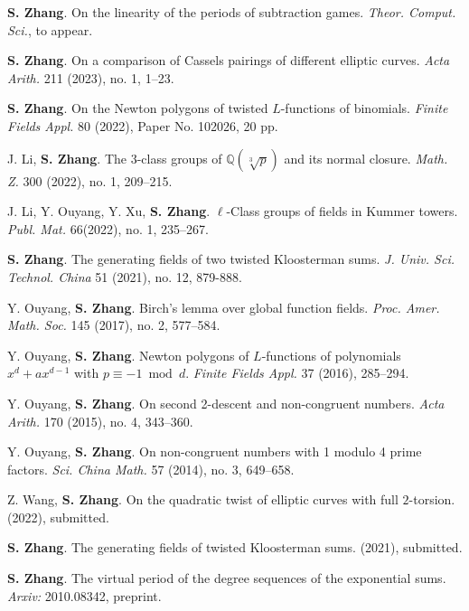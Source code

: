 \documentclass[11pt]{article}
\begin{document}
\newpage
{}
\begin{cvlist}
	\item \textbf{S. Zhang}.
	On the linearity of the periods of subtraction games.
	{\em Theor. Comput. Sci.}, to appear.
	
	\item \textbf{S. Zhang}.
	On a comparison of Cassels pairings of different elliptic curves.
	{\em Acta Arith.} 211 (2023), no. 1, 1--23.
	
	\item \textbf{S. Zhang}.
	On the Newton polygons of twisted $L$-functions of binomials.
	{\em Finite Fields Appl.} 80 (2022), Paper No. 102026, 20 pp.

	\item J. Li, \textbf{S. Zhang}.
	The $3$-class groups of $\mathbb{Q}(\sqrt[3]{p})$ and its normal closure.
	{\em Math. Z.} 300 (2022), no. 1, 209--215.

	\item J. Li, Y. Ouyang, Y. Xu, \textbf{S. Zhang}.
	$\ell$-Class groups of fields in Kummer towers.
	{\em Publ. Mat.} 66(2022), no. 1, 235--267.

	\item \textbf{S. Zhang}.
	The generating fields of two twisted Kloosterman sums.
	{\em J. Univ. Sci. Technol. China} 51 (2021), no. 12, 879-888.

	\item Y. Ouyang, \textbf{S. Zhang}.
	Birch's lemma over global function fields.
	{\em Proc. Amer. Math. Soc.} 145 (2017), no. 2, 577--584.

	\item Y. Ouyang, \textbf{S. Zhang}.
	Newton polygons of $L$-functions of polynomials $x^d+ax^{d-1}$ with $p\equiv -1 \bmod d$.
	{\em Finite Fields Appl.} 37 (2016), 285--294.

	\item Y. Ouyang, \textbf{S. Zhang}.
	On second 2-descent and non-congruent numbers.
	{\em Acta Arith.} 170 (2015), no. 4, 343--360.

	\item Y. Ouyang, \textbf{S. Zhang}.
	On non-congruent numbers with 1 modulo 4 prime factors.
	{\em Sci. China Math.} 57 (2014), no. 3, 649--658.
\end{cvlist}


\begin{cvlist}
	\item Z. Wang, \textbf{S. Zhang}.
	On the quadratic twist of elliptic curves with full $2$-torsion.
	(2022), submitted.

	\item \textbf{S. Zhang}.
	The generating fields of twisted Kloosterman sums.
	(2021), submitted.

	\item \textbf{S. Zhang}.
	The virtual period of the degree sequences of the exponential sums.
	{\em Arxiv:} 2010.08342, preprint.
\end{cvlist}
\end{document}
